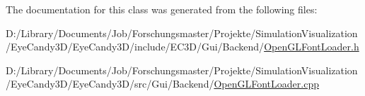 The documentation for this class was generated from the following files\+:\begin{DoxyCompactItemize}
\item 
D\+:/\+Library/\+Documents/\+Job/\+Forschungsmaster/\+Projekte/\+Simulation\+Visualization/\+Eye\+Candy3\+D/\+Eye\+Candy3\+D/include/\+E\+C3\+D/\+Gui/\+Backend/\mbox{\hyperlink{_open_g_l_font_loader_8h}{Open\+G\+L\+Font\+Loader.\+h}}\item 
D\+:/\+Library/\+Documents/\+Job/\+Forschungsmaster/\+Projekte/\+Simulation\+Visualization/\+Eye\+Candy3\+D/\+Eye\+Candy3\+D/src/\+Gui/\+Backend/\mbox{\hyperlink{_open_g_l_font_loader_8cpp}{Open\+G\+L\+Font\+Loader.\+cpp}}\end{DoxyCompactItemize}
